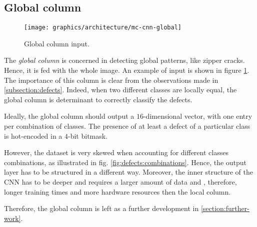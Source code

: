     \subsection{Global column}\label{section:global-column}
        \begin{figure}
            \centering
            \texttt{[image: graphics/architecture/mc-cnn-global]}
            \caption{Global column input.}\label{fig:mc-cnn:global-input}
        \end{figure}
        \par{
            The \emph{global column} is concerned in detecting global patterns, like zipper cracks. Hence, it is fed with the whole image. An example of input is shown in figure \ref{fig:mc-cnn:global-input}. The importance of this column is clear from the observations made in \ref{subsection:defects}. Indeed, when two different classes are locally equal, the global column is determinant to correctly classify the defects.
        }
        \par{
            Ideally, the global column should output a $16$-dimensional vector, with one entry per combination of classes. The presence of at least a defect of a particular class is hot-encoded in a $4$-bit bitmask.
        }
        \par{
            However, the dataset is very skewed when accounting for different classes combinations, as illustrated in fig. \ref{fig:defects:combinations}. Hence, the output layer has to be structured in a different way. Moreover, the inner structure of the CNN has to be deeper and requires a larger amount of data and 
            , therefore, longer training times and more hardware resources then the local column.
        }
        \par{
            Therefore, the global column is left as a further development in \ref{section:further-work}.
        }

